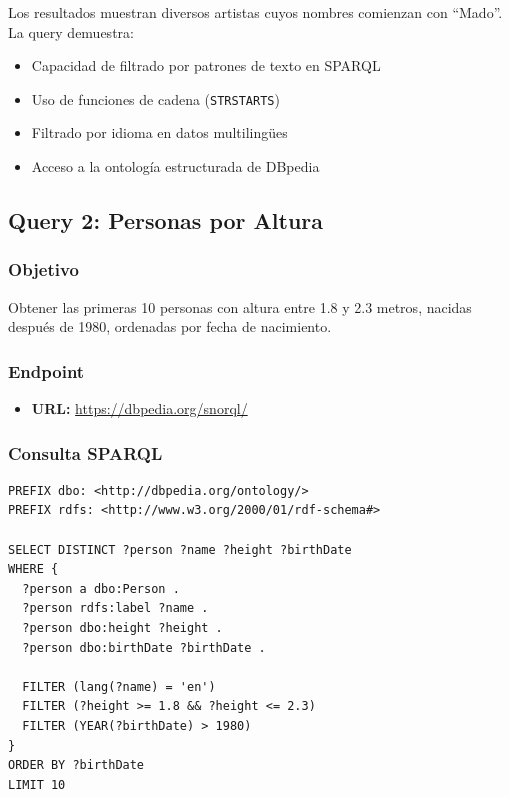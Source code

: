 \documentclass[12pt,a4paper]{article}
\begin{document}
Los resultados muestran diversos artistas cuyos nombres comienzan con ``Mado''. La query demuestra:
\begin{itemize}
    \item Capacidad de filtrado por patrones de texto en SPARQL
    \item Uso de funciones de cadena (\texttt{STRSTARTS})
    \item Filtrado por idioma en datos multilingües
    \item Acceso a la ontología estructurada de DBpedia
\end{itemize}

\subsection{Query 2: Personas por Altura}

\subsubsection{Objetivo}

Obtener las primeras 10 personas con altura entre 1.8 y 2.3 metros, nacidas después de 1980, ordenadas por fecha de nacimiento.

\subsubsection{Endpoint}

\begin{itemize}
    \item \textbf{URL:} \url{https://dbpedia.org/snorql/}
\end{itemize}

\subsubsection{Consulta SPARQL}

\begin{lstlisting}[language=SPARQL, caption={Query 2: Personas por altura y fecha de nacimiento}]
PREFIX dbo: <http://dbpedia.org/ontology/>
PREFIX rdfs: <http://www.w3.org/2000/01/rdf-schema#>

SELECT DISTINCT ?person ?name ?height ?birthDate
WHERE {
  ?person a dbo:Person .
  ?person rdfs:label ?name .
  ?person dbo:height ?height .
  ?person dbo:birthDate ?birthDate .
  
  FILTER (lang(?name) = 'en')
  FILTER (?height >= 1.8 && ?height <= 2.3)
  FILTER (YEAR(?birthDate) > 1980)
}
ORDER BY ?birthDate
LIMIT 10
\end{lstlisting}
\end{document}
